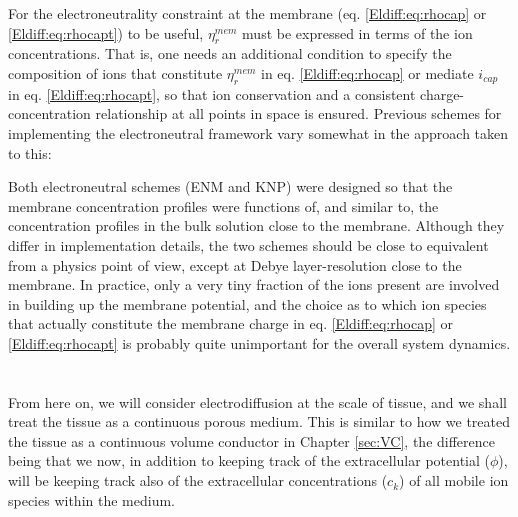 For the electroneutrality constraint at the membrane (eq. \ref{Eldiff:eq:rhocap} or \ref{Eldiff:eq:rhocapt}) to be useful, $\eta_{r}^{mem}$ must be expressed in terms of the ion concentrations. That is, one needs an additional condition to specify the composition of ions that constitute $\eta_{r}^{mem}$ in eq. \ref{Eldiff:eq:rhocap} or mediate $i_{cap}$ in eq. \ref{Eldiff:eq:rhocapt}, so that ion conservation and a consistent charge-concentration relationship  at all points in space is ensured. Previous schemes for implementing the electroneutral framework vary somewhat in the approach taken to this:


Both electroneutral schemes (ENM and KNP) were designed so that the membrane concentration profiles were functions of, and similar to, the concentration profiles in the bulk solution close to the membrane. Although they differ in implementation details, the two schemes should be close to equivalent from a physics point of view, except at Debye layer-resolution close to the membrane.  In practice, only a very tiny fraction of the ions present are involved in building up the membrane potential, and the choice as to which ion species that actually constitute the membrane charge in eq. \ref{Eldiff:eq:rhocap} or \ref{Eldiff:eq:rhocapt} is probably quite unimportant for the overall system dynamics.


\section{}
\label{sec:Eldiff:porous}
From here on, we will consider electrodiffusion at the scale of tissue, and we shall treat the tissue as a continuous porous medium. This is similar to how we treated the tissue as a continuous volume conductor in Chapter \ref{sec:VC}, the difference being that we now, in addition to keeping track of the extracellular potential ($\phi$), will be keeping track also of the extracellular concentrations ($c_k$) of all mobile ion species within the medium. 

